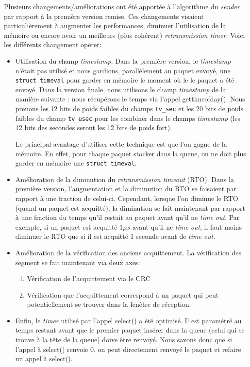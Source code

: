 \documentclass[12pt,notitlepage]{report}
\newcommand{\pkg}[1]{\texttt{#1}}
\newcommand{\op}[1]{\textsf{#1}}
\begin{document}
\begin{appendices}
	Plusieurs changements/améliorations ont été apportée à l'algorithme du \textit{sender} par rapport à la première version remise. Ces changements visaient particulièrement à augmenter les performances, diminuer l'utilisation de la mémoire ou encore avoir un meilleurs (plus cohérent) \textit{retransmission timer}. Voici les différents changement opérer:
	\begin{itemize}
		\item Utilisation du champ \textit{timestamp}. Dans la première version, le \textit{timestamp} n'était pas utilisé et nous gardions, parallèlement au paquet envoyé, une \pkg{struct timeval} pour garder en mémoire le moment où le le paquet a été envoyé. Dans la version finale, nous utilisons le champ \textit{timestamp} de la manière suivante : nous récupérons le temps via l'appel \op{gettimeofday()}. Nous prenons les 12 bits de poids faibles du champs \pkg{tv\_sec} et les 20 bits de poids faibles du champ \pkg{tv\_usec} pour les combiner dans le champs \textit{timestamp} (les 12 bits des secondes seront les 12 bits de poids fort).
		
		Le principal avantage d'utiliser cette technique est que l'on gagne de la mémoire. En effet, pour chaque paquet stocker dans la queue, on ne doit plus garder en mémoire une \pkg{struct timeval}.
		
		\item Amélioration de la diminution du \textit{retransmission timeout} (RTO). Dans la première version, l'augmentation et la diminution du RTO se faisaient par rapport à une fraction de celui-ci. Cependant, lorsque l'on diminue le RTO (quand un paquet est acquitté), la diminution se fait maintenant par rapport à une fraction du temps qu'il restait au paquet avant qu'il ne \textit{time out}. Par exemple, si un paquet est acquitté $1\mu s$ avant qu'il ne \textit{time out}, il faut moins diminuer le RTO que si il est acquitté 1 seconde avant de \textit{time out}.
		
		\item Amélioration de la vérification des anciens acquittement. La vérification des segment se fait maintenant via deux axes:
			\begin{enumerate}
				\item Vérification de l'acquittement via le CRC
				\item Vérification que l'acquittement correspond à un paquet qui peut potentiellement se trouver dans la fenêtre de réception.
			\end{enumerate}
		\item Enfin, le \textit{timer} utilisé par l'appel \op{select()} a été optimisé. Il est paramétré au temps restant avant que le premier paquet insérer dans la queue (celui qui se trouve à la tête de la queue) doive être renvoyé. Nous savons donc que si l'appel à \op{select()} renvoie 0, on peut directement renvoyé le paquet et refaire un appel à \op{select()}.
	\end{itemize}
\end{appendices}
\end{document}
